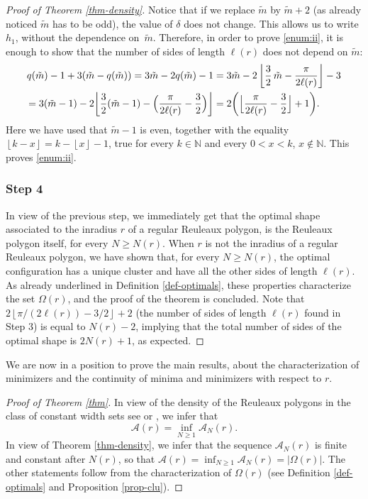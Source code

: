 \documentclass[JEP,XML,SOM,Unicode,NoFloatCountersInSection]{cedram}
\let\mathcal\mathscr
\theoremstyle{plain}
\theoremstyle{definition}
\newcommand\A{\mathcal A}
\begin{document}
\begin{proof}[Proof of Theorem \ref{thm-density}]
Notice that if we replace $\tilde{m}$ by $\tilde{m}+2$ (as already noticed $\tilde{m}$ has to be odd), the value of $\delta$ does not change. This allows us to write $h_1$, without the dependence on~$\tilde{m}$. Therefore, in order to prove \eqref{enum:ii}, it is enough to show that the number of sides of length $\ell(r)$ does not depend on $\tilde{m}$:
\begin{align*}
q (\tilde{m})-1+ 3 (\tilde{m}-q(\tilde{m})) = 3 \tilde{m} - 2 q(\tilde{m})-1 &= 3 \tilde{m} - 2 \left\lfloor \frac32\, \tilde{m} - \frac{\pi}{2\ell(r)} \right\rfloor - 3
\\ = 3 (\tilde{m}-1) - 2 \biggl\lfloor \frac32 (\tilde{m}-1) - \Bigl(\frac{\pi}{2\ell(r)} - \frac32 \Bigr) \biggr\rfloor &= 2 \biggl( \Bigl\lfloor \frac{\pi}{2\ell(r)} - \frac32 \Bigr\rfloor+ 1\biggr).
\end{align*}
Here we have used that $\tilde{m}-1$ is even, together with the equality $\left\lfloor k - x\right\rfloor= k -\left\lfloor x \right\rfloor - 1$, true for every $k\in \mathbb N$ and every $0<x<k$, $x\notin \mathbb N$. This proves \eqref{enum:ii}.

\subsubsection*{Step 4} In view of the previous step, we immediately get that the optimal shape associated to the inradius $r$ of a regular Reuleaux polygon, is the Reuleaux polygon itself, for every $N\geq N(r)$. When $r$ is not the inradius of a regular Reuleaux polygon, we have shown that, for every $N\geq N(r)$, the optimal configuration has a unique cluster and have all the other sides of length $\ell(r)$. As already underlined in Definition \ref{def-optimals}, these properties characterize the set $ \Omega(r)$, and the proof of the theorem is concluded. Note that $2 \left\lfloor \pi/(2\ell(r))- 3/2\right\rfloor+2$ (\ie the number of sides of length $\ell(r)$ found in Step 3) is equal to $N(r)-2$, implying that the total number of sides of the optimal shape is $2N(r)+1$, as expected.
\end{proof}

We are now in a position to prove the main results, about the characterization of minimizers and the continuity of minima and minimizers with respect to $r$.
\begin{proof}[Proof of Theorem \ref{thm}]
In view of the density of the Reuleaux polygons in the class of constant width sets see \cite{BF} or \cite{Buc}, we infer that
\[
\A(r)=\inf_{ {N\geq 1}} \A_N(r).
\]
In view of Theorem \ref{thm-density}, we infer that the sequence $\A_N(r)$ is finite and constant after $N(r)$, so that $\A(r)=\inf_{ {N\geq 1}}\A_N(r)=|\Omega(r)|$. The other statements follow from the characterization of $\Omega(r)$ (see Definition \ref{def-optimals} and Proposition \ref{prop-clu}).
\end{proof}
\end{document}
